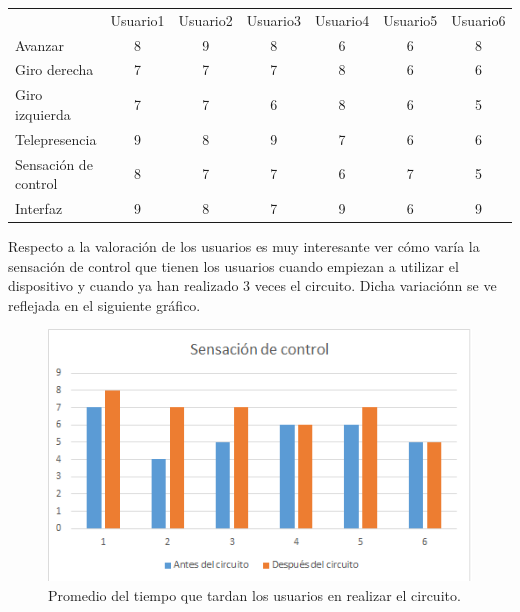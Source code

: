 \documentclass[twoside, 12pt]{epstfg}
\begin{document}
\begin{itemize}
\begin{center}
	
	\resizebox{15cm}{!} {
		\begin{tabular}{|g c c c c c c|}
			\hline
			 \\ \hline
			& Usuario1	&Usuario2	&Usuario3	&Usuario4	&Usuario5	&Usuario6 \\
			Avanzar
			& 8 &9 &8 &6 &6 & 8\\
			Giro derecha
			& 7 & 7 &7 &8 & 6& 6\\
			Giro izquierda
			& 7 & 7&6 &8 &6 & 5\\
			Telepresencia
			& 9 & 8 &9 & 7& 6& 6\\ 
			Sensación de control
			& 8 &7 &7 & 6&7 & 5\\
			Interfaz
			& 9 &8 & 7& 9& 6& 9\\
			\hline
		\end{tabular}
	}
\end{center}


Respecto a la valoración de los usuarios es muy interesante ver cómo varía la sensación de control que tienen los usuarios cuando empiezan a utilizar el dispositivo y cuando ya han realizado 3 veces el circuito. Dicha variaciónn se ve reflejada en el siguiente gráfico.

\begin{figure}[h!]
	\centerline{
		\mbox{\includegraphics[width=.85\textwidth]{images/SensacionControl.png}}
	}
	\caption{Promedio del tiempo que tardan los usuarios en realizar el circuito.}
\end{figure}



\end{itemize}
\end{document}
